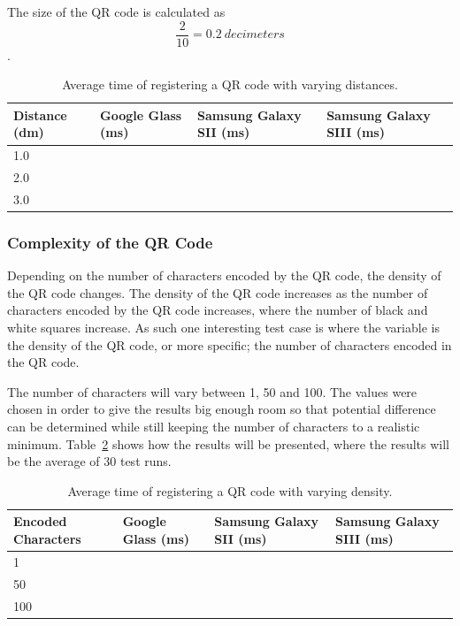 The size of the QR code is calculated as \[\frac{2}{10} = 0.2~decimeters\].

	\begin{table}[ht!]
    		\caption{Average time of registering a QR code with varying distances.} \label{tab:distanceAverage}
		\centering \begin{tabularx}{\textwidth}{l|X|X|X} \hline
		\textbf{Distance (dm)} & \textbf{Google Glass (ms)} & \textbf{Samsung Galaxy SII (ms)} & \textbf{Samsung Galaxy SIII (ms)} \\ \hline \hline
       
		1.0	&	&	&	\\ \hline
		2.0	&	&	&	\\ \hline
		3.0	&	&	&	\\ \hline
		
		\end{tabularx}
	\end{table}

\subsubsection{Complexity of the QR Code}
Depending on the number of characters encoded by the QR code, the density of the QR code changes. The density of the QR code increases as the number of characters encoded by the QR code increases, where the number of black and white squares increase. As such one interesting test case is where the variable is the density of the QR code, or more specific; the number of characters encoded in the QR code.

The number of characters will vary between 1, 50 and 100. The values were chosen in order to give the results big enough room so that potential difference can be determined while still keeping the number of characters to a realistic minimum. Table~\ref{tab:complexityAverage} shows how the results will be presented, where the results will be the average of 30 test runs.

	\begin{table}[ht!]
    		\caption{Average time of registering a QR code with varying density.} \label{tab:complexityAverage}
		\centering \begin{tabularx}{\textwidth}{l|X|X|X} \hline
		\textbf{Encoded Characters} & \textbf{Google Glass (ms)} & \textbf{Samsung Galaxy SII (ms)} & \textbf{Samsung Galaxy SIII (ms)} \\ \hline \hline
       
		1	&	&	&	\\ \hline
		50	&	&	&	\\ \hline
		100	&	&	&	\\ \hline
		
		\end{tabularx}
	\end{table}

